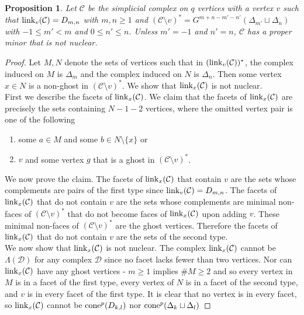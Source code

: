 \documentclass[letterpaper,12pt]{amsart}
\theoremstyle{plain}
\newtheorem{prop}[thm]{Proposition}
\theoremstyle{definition}
\theoremstyle{remark}
\newcommand{\calc}{\mathcal{C}}
\newcommand{\link}{\textnormal{link}}
\newcommand{\cone}{\textnormal{cone}}
\begin{document}
{
\begin{prop}\label{m'n'}
	Let $\mathcal{C}$ be the simplicial complex on $q$ vertices
	with a vertex $v$ such that $\link_v(\mathcal{C}) = D_{m,n}$ with $m,n \ge 1$
	and $(\mathcal{C}\setminus v)^* = G^{m+n-m'-n'}(\Delta_{m'} \sqcup \Delta_{n})$ with $-1 \le m' < m$ and $0 \le n' \le n$.
	Unless $m' = -1$ and $n' = n$, $\mathcal{C}$ has a proper minor that is not nuclear.
\end{prop}
\begin{proof}
	Let $M,N$ denote the sets of vertices such that
	in $(\link_v(\mathcal{C}))^*$, the complex induced on $M$ is $\Delta_m$
	and the complex induced on $N$ is $\Delta_n$.
	Then some vertex $x \in N$ is a non-ghost in $(\mathcal{C}\setminus v)^*$.
	We show that $\link_x(\mathcal{C})$ is not nuclear.
	\\
	\indent
	First we describe the facets of $\link_x(\mathcal{C})$.
	We claim that the facets of $\link_x(\mathcal{C})$
	are precisely the sets containing $N-1-2$ vertices,
	where the omitted vertex pair is one of the following
	\begin{enumerate}
		\item some $a \in M$ and some $b \in N\setminus\{x\}$ or
		\item $v$ and some vertex $g$ that is a ghost in $(\mathcal{C}\setminus v)^*$.
	\end{enumerate}
	We now prove the claim.
	The facets of $\link_x(\mathcal{C})$ that contain $v$
	are the sets whose complements are pairs of the first type since $\link_v(\mathcal{C}) = D_{m,n}$.
	The facets of $\link_x(\mathcal{C})$ that do not contain $v$
	are the sets whose complements are minimal non-faces of $(\mathcal{C}\setminus v)^*$
	that do not become faces of $\link_x(\mathcal{C})$ upon adding $v$.
	These minimal non-faces of $(\mathcal{C}\setminus v)^*$ are the ghost vertices.
	Therefore the facets of $\link_x(\calc)$ that do not contain $v$ are the sets of the second type.
	\\
	\indent
	We now show that $\link_x(\mathcal{C})$ is not nuclear.
	The complex $\link_x(\mathcal{C})$ cannot be $\Lambda(\mathcal{D})$
	for any complex $\mathcal{D}$ since no facet lacks fewer than two vertices.
	Nor can $\link_x(\mathcal{C})$ have any ghost vertices -
	$m \ge 1$ implies $\#M \ge 2$ and so every vertex in $M$ is in a facet of the first type,
	every vertex of $N$ is in a facet of the second type, and $v$ is in every facet of the first type.
	It is clear that no vertex is in every facet,
	so $\link_x(\mathcal{C})$ cannot be $\cone^p(D_{k,l})$ nor $\cone^p(\Delta_k \sqcup \Delta_l)$

\end{proof}}
\end{document}
